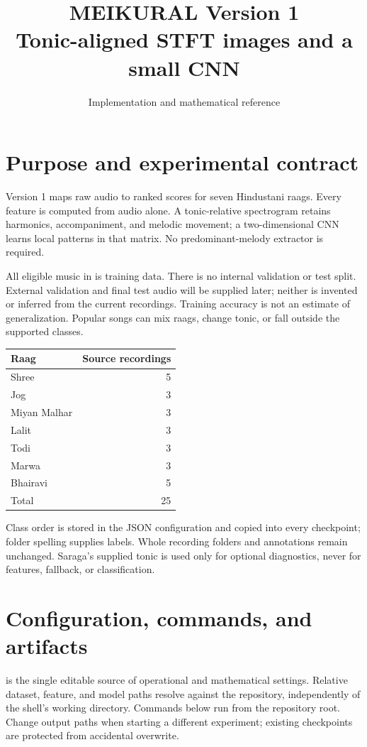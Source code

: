 \documentclass[11pt,a4paper]{article}
\title{MEIKURAL Version 1\\Tonic-aligned STFT images and a small CNN}
\author{Implementation and mathematical reference}
\date{}
\begin{document}
\maketitle
\tableofcontents

\section{Purpose and experimental contract}
Version 1 maps raw audio to ranked scores for seven Hindustani raags. Every
feature is computed from audio alone. A tonic-relative spectrogram retains
harmonics, accompaniment, and melodic movement; a two-dimensional CNN learns
local patterns in that matrix. No predominant-melody extractor is required.

All eligible music in  is training data. There is no internal
validation or test split. External validation and final test audio will be
supplied later; neither is invented or inferred from the current recordings.
Training accuracy is not an estimate of generalization. Popular songs can mix
raags, change tonic, or fall outside the supported classes.

\begin{center}
\begin{tabular}{lr}\toprule
Raag & Source recordings\\\midrule
Shree & 5\\ Jog & 3\\ Miyan Malhar & 3\\ Lalit & 3\\
Todi & 3\\ Marwa & 3\\ Bhairavi & 5\\\midrule
Total & 25\\\bottomrule
\end{tabular}
\end{center}
Class order is stored in the JSON configuration and copied into every checkpoint;
folder spelling supplies labels. Whole recording folders and annotations remain
unchanged. Saraga's supplied tonic is used only for optional diagnostics, never
for features, fallback, or classification.

\section{Configuration, commands, and artifacts}
 is the single editable source of operational and
mathematical settings. Relative dataset, feature, and model paths resolve against
the repository, independently of the shell's working directory. Commands below
run from the repository root. Change output paths when starting a different
experiment; existing checkpoints are protected from accidental overwrite.
\end{document}
